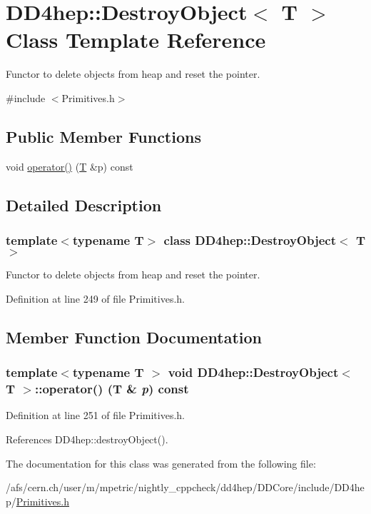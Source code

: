 \hypertarget{class_d_d4hep_1_1_destroy_object}{
\section{DD4hep::DestroyObject$<$ T $>$ Class Template Reference}
\label{class_d_d4hep_1_1_destroy_object}
}


Functor to delete objects from heap and reset the pointer.  


{\ttfamily \#include $<$Primitives.h$>$}\subsection*{Public Member Functions}
\begin{DoxyCompactItemize}
\item 
void \hyperlink{class_d_d4hep_1_1_destroy_object_a246f14e06cdf1d3cce39001dfeb9b867}{operator()} (\hyperlink{class_t}{T} \&p) const 
\end{DoxyCompactItemize}


\subsection{Detailed Description}
\subsubsection*{template$<$typename T$>$ class DD4hep::DestroyObject$<$ T $>$}

Functor to delete objects from heap and reset the pointer. 

Definition at line 249 of file Primitives.h.

\subsection{Member Function Documentation}
\hypertarget{class_d_d4hep_1_1_destroy_object_a246f14e06cdf1d3cce39001dfeb9b867}{
\subsubsection[{operator()}]{\setlength{\rightskip}{0pt plus 5cm}template$<$typename T $>$ void {\bf DD4hep::DestroyObject}$<$ {\bf T} $>$::operator() ({\bf T} \& {\em p}) const}}
\label{class_d_d4hep_1_1_destroy_object_a246f14e06cdf1d3cce39001dfeb9b867}


Definition at line 251 of file Primitives.h.

References DD4hep::destroyObject().

The documentation for this class was generated from the following file:\begin{DoxyCompactItemize}
\item 
/afs/cern.ch/user/m/mpetric/nightly\_\-cppcheck/dd4hep/DDCore/include/DD4hep/\hyperlink{_primitives_8h}{Primitives.h}\end{DoxyCompactItemize}
